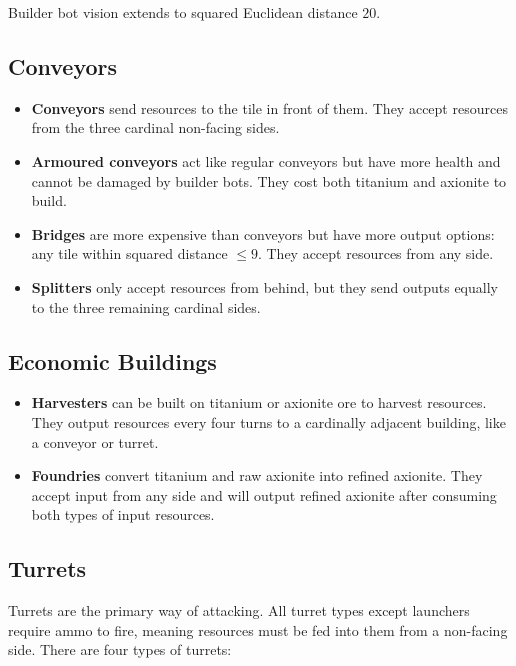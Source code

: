 \documentclass[10pt,sigconf,nonacm]{acmart}
\begin{document}
Builder bot vision extends to squared Euclidean distance $20$.

\subsection{Conveyors}

\begin{itemize}[leftmargin=*]
  \item \textbf{Conveyors} send resources to the tile in front of them. They accept resources from the three cardinal non-facing sides.

  \item \textbf{Armoured conveyors} act like regular conveyors but have more health and cannot be damaged by builder bots. They cost both titanium and axionite to build.

  \item \textbf{Bridges} are more expensive than conveyors but have more output options: any tile within squared distance $\leq 9$. They accept resources from any side.

  \item \textbf{Splitters} only accept resources from behind, but they send outputs equally to the three remaining cardinal sides.
\end{itemize}

\subsection{Economic Buildings}

\begin{itemize}[leftmargin=*]
  \item \textbf{Harvesters} can be built on titanium or axionite ore to harvest resources. They output resources every four turns to a cardinally adjacent building, like a conveyor or turret.

  \item \textbf{Foundries} convert titanium and raw axionite into refined axionite. They accept input from any side and will output refined axionite after consuming both types of input resources.
\end{itemize}

\subsection{Turrets}

Turrets are the primary way of attacking. All turret types except launchers require ammo to fire, meaning resources must be fed into them from a non-facing side. There are four types of turrets:
\end{document}
